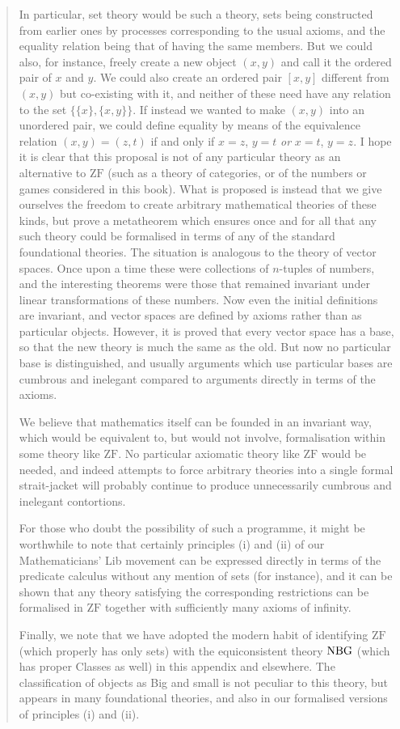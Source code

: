 \documentclass{bhamthesis}
\theoremstyle{definition}
\newcommand{\ZF}{\mathrm{ZF}}
\begin{document}
\begin{quotation}
 In particular, set theory would be such a theory, sets being
 constructed from earlier ones by processes corresponding to the
 usual axioms, and the equality relation being that of having the
 same members.  But we could also, for instance, freely create a
 new object $(x,y)$ and call it the ordered pair of $x$ and $y$.
 We could also create an ordered pair $[x,y]$ different from
 $(x,y)$ but co-existing with it, and neither of these need have
 any relation to the set $\{\{x\},\{x,y\}\}$.  If instead we
 wanted to make $(x,y)$ into an unordered pair, we could define
 equality by means of the equivalence relation $(x,y) = (z,t)$ if
 and only if $x = z$, $y = t$ \textit{or} $x = t$, $y = z$.  I
 hope it is clear that this proposal is not of any particular
 theory as an alternative to $\ZF$ (such as a theory of
 categories, or of the numbers or games considered in this book).
 What is proposed is instead that we give ourselves the freedom to
 create arbitrary mathematical theories of these kinds, but prove
 a metatheorem which ensures once and for all that any such theory
 could be formalised in terms of any of the standard foundational
 theories. The situation is analogous to the theory of vector
 spaces.  Once upon a time these were collections of $n$-tuples of
 numbers, and the interesting theorems were those that remained
 invariant under linear transformations of these numbers.  Now
 even the initial definitions are invariant, and vector spaces are
 defined by axioms rather than as particular objects.  However, it
 is proved that every vector space has a base, so that the new
 theory is much the same as the old.  But now no particular base
 is distinguished, and usually arguments which use particular
 bases are cumbrous and inelegant compared to arguments directly
 in terms of the axioms.

 We believe that mathematics itself can be founded in an invariant
 way, which would be equivalent to, but would not involve,
 formalisation within some theory like $\ZF$.  No particular
 axiomatic theory like $\ZF$ would be needed, and indeed attempts
 to force arbitrary theories into a single formal strait-jacket
 will probably continue to produce unnecessarily cumbrous and
 inelegant contortions.

 For those who doubt the possibility of such a programme, it might
 be worthwhile to note that certainly principles (i) and (ii) of
 our Mathematicians' Lib movement can be expressed directly in
 terms of the predicate calculus without any mention of sets (for
 instance), and it can be shown that any theory satisfying the
 corresponding restrictions can be formalised in $\ZF$ together
 with sufficiently many axioms of infinity.

 Finally, we note that we have adopted the modern habit of
 identifying $\ZF$ (which properly has only sets) with the
 equiconsistent theory $\rm NBG$ (which has proper Classes as
 well) in this appendix and elsewhere.  The classification of
 objects as Big and small is not peculiar to this theory, but
 appears in many foundational theories, and also in our formalised
 versions of principles (i) and (ii).
\end{quotation}
\end{document}
